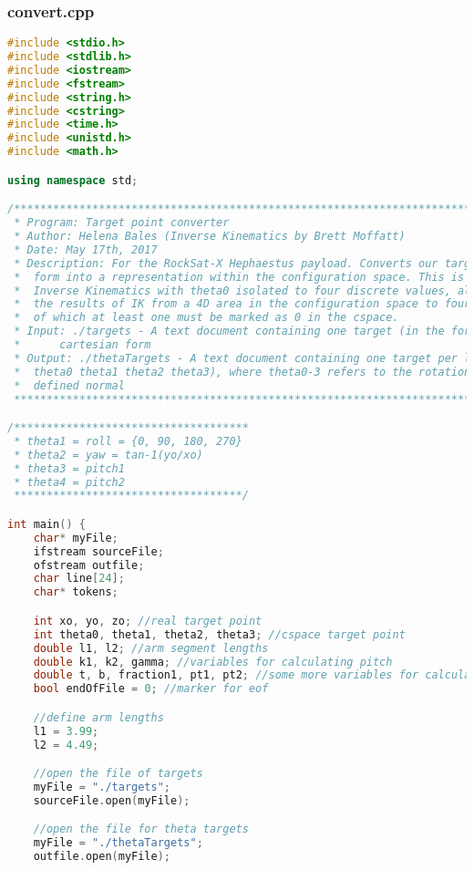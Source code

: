 \subsubsection{convert.cpp}
\begin{lstlisting}[language=C++]
#include <stdio.h>
#include <stdlib.h>
#include <iostream>
#include <fstream>
#include <string.h>
#include <cstring>
#include <time.h>
#include <unistd.h>
#include <math.h>

using namespace std;

/************************************************************************************************
 * Program: Target point converter
 * Author: Helena Bales (Inverse Kinematics by Brett Moffatt)
 * Date: May 17th, 2017
 * Description: For the RockSat-X Hephaestus payload. Converts our target points from cartesian 
 * 	form into a representation within the configuration space. This is accomplished through 
 * 	Inverse Kinematics with theta0 isolated to four discrete values, allowing us to resolve 
 * 	the results of IK from a 4D area in the configuration space to four possible solutions,
 * 	of which at least one must be marked as 0 in the cspace.
 * Input: ./targets - A text document containing one target (in the form: x y z) per line, in 
 * 		cartesian form
 * Output: ./thetaTargets - A text document containing one target per line (in the form: 
 * 	theta0 theta1 theta2 theta3), where theta0-3 refers to the rotational angle from the 
 * 	defined normal
 ***********************************************************************************************/

/************************************
 * theta1 = roll = {0, 90, 180, 270}
 * theta2 = yaw = tan-1(yo/xo)
 * theta3 = pitch1
 * theta4 = pitch2
 ***********************************/

int main() {
	char* myFile;
	ifstream sourceFile;
	ofstream outfile;
	char line[24];
	char* tokens;

	int xo, yo, zo;	//real target point
	int theta0, theta1, theta2, theta3; //cspace target point
	double l1, l2; //arm segment lengths
	double k1, k2, gamma; //variables for calculating pitch
	double t, b, fraction1, pt1, pt2; //some more variables for calculations
	bool endOfFile = 0; //marker for eof

	//define arm lengths
	l1 = 3.99;
	l2 = 4.49;

	//open the file of targets
	myFile = "./targets";
	sourceFile.open(myFile);

	//open the file for theta targets
	myFile = "./thetaTargets";
	outfile.open(myFile);



\end{lstlisting}

